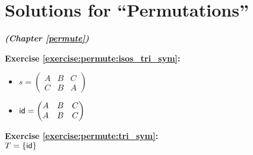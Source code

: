
\section{Solutions for ``Permutations''}
\noindent\textbf{\textit{ (Chapter \ref{permute})}}\bigskip


\noindent\textbf{Exercise \ref{exercise:permute:isos_tri_sym}:}
\begin{multicols}{2}
\begin{itemize}
\item
$s = \begin{pmatrix}
A & B & C\\
C & B & A
\end{pmatrix}$

\item
$\sf{id} = \begin{pmatrix}
A & B & C \\
A & B & C
\end{pmatrix}$
\end{itemize}
\end{multicols}

\noindent\textbf{Exercise \ref{exercise:permute:tri_sym}:}\\
$T = \{\sf{id}\}$\\

